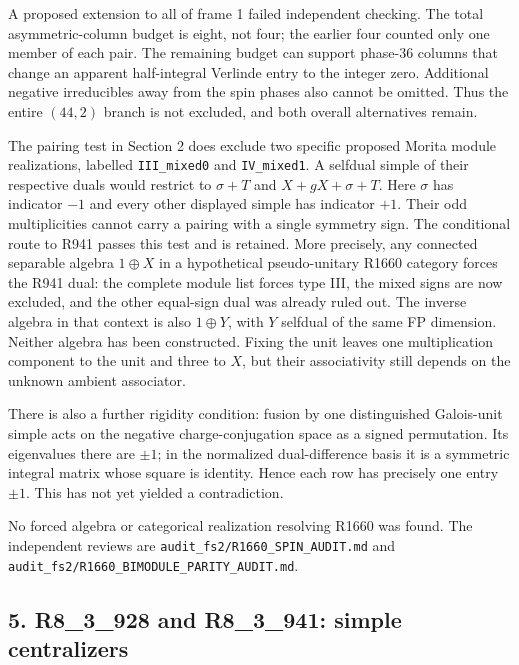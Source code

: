 \documentclass[
  11pt,
]{article}
\begin{document}
A proposed extension to all of frame 1 failed independent checking. The
total asymmetric-column budget is eight, not four; the earlier four
counted only one member of each pair. The remaining budget can support
phase-36 columns that change an apparent half-integral Verlinde entry to
the integer zero. Additional negative irreducibles away from the spin
phases also cannot be omitted. Thus the entire \((44,2)\) branch is not
excluded, and both overall alternatives remain.

The pairing test in Section 2 does exclude two specific proposed Morita
module realizations, labelled \texttt{III\_mixed0} and
\texttt{IV\_mixed1}. A selfdual simple of their respective duals would
restrict to \(\sigma+T\) and \(X+gX+\sigma+T\). Here \(\sigma\) has
indicator \(-1\) and every other displayed simple has indicator \(+1\).
Their odd multiplicities cannot carry a pairing with a single symmetry
sign. The conditional route to R941 passes this test and is retained.
More precisely, any connected separable algebra \(1\oplus X\) in a
hypothetical pseudo-unitary R1660 category forces the R941 dual: the
complete module list forces type III, the mixed signs are now excluded,
and the other equal-sign dual was already ruled out. The inverse algebra
in that context is also \(1\oplus Y\), with \(Y\) selfdual of the same
FP dimension. Neither algebra has been constructed. Fixing the unit
leaves one multiplication component to the unit and three to \(X\), but
their associativity still depends on the unknown ambient associator.

There is also a further rigidity condition: fusion by one distinguished
Galois-unit simple acts on the negative charge-conjugation space as a
signed permutation. Its eigenvalues there are \(\pm1\); in the
normalized dual-difference basis it is a symmetric integral matrix whose
square is identity. Hence each row has precisely one entry \(\pm1\).
This has not yet yielded a contradiction.

No forced algebra or categorical realization resolving R1660 was found.
The independent reviews are \texttt{audit\_fs2/R1660\_SPIN\_AUDIT.md}
and \texttt{audit\_fs2/R1660\_BIMODULE\_PARITY\_AUDIT.md}.

\hypertarget{r8_3_928-and-r8_3_941-simple-centralizers}{%
\subsection{5. R8\_3\_928 and R8\_3\_941: simple
centralizers}\label{r8_3_928-and-r8_3_941-simple-centralizers}}
\end{document}
